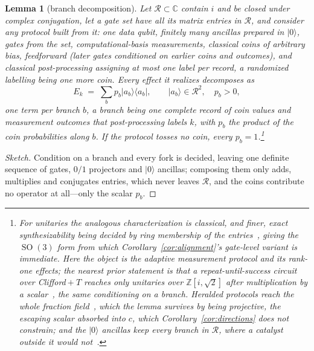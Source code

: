 \documentclass[11pt, oneside, openany]{scrbook}
\DeclareMathOperator{\SO}{SO}
\newcommand{\C}{\mathbb{C}}
\newtheorem{lemma}[theorem]{Lemma}
\newenvironment{sketch}{\renewcommand{\qedsymbol}{}\begin{proof}[Sketch]}{\end{proof}}
\newcommand{\ket}[1]{|#1\rangle}
\newcommand{\ketbra}[2]{|#1\rangle\langle#2|}
\begin{document}
\begin{lemma}[branch decomposition] \label{lem:branch}
Let $\mathcal{R} \subset \C$ contain $i$ and be closed under complex conjugation, let a gate set have all its matrix entries in $\mathcal{R}$, and consider any protocol built from it: one data qubit, finitely many ancillas prepared in $\ket{0}$, gates from the set, computational-basis measurements, classical coins of arbitrary bias, feedforward (later gates conditioned on earlier coins and outcomes), and classical post-processing assigning at most one label per record, a randomized labelling being one more coin. Every effect it realizes decomposes as
\begin{equation*}
E_k \;=\; \sum_{b} p_b \ketbra{a_b}{a_b}, \qquad \ket{a_b} \in \mathcal{R}^2, \quad p_b > 0,
\end{equation*}
one term per \textit{branch} $b$, a branch being one complete record of coin values and measurement outcomes that post-processing labels $k$, with $p_b$ the product of the coin probabilities along $b$. If the protocol tosses no coin, every $p_b = 1$.\footnote{For \textit{unitaries} the analogous characterization is classical, and finer, exact synthesizability being decided by \textit{ring} membership of the entries~\cite{kliuchnikov2013fastefficientexacta,giles2013exactsynthesismultiqubit,kliuchnikov2015frameworkexactsynthesis}, \textcite[\S2.4]{forest2015exactsynthesissinglequbit} giving the $\SO(3)$ form from which Corollary~\ref{cor:alignment}'s gate-level variant is immediate. Here the object is the adaptive measurement protocol and its rank-one effects; the nearest prior statement is that a repeat-until-success circuit over Clifford${}+T$ reaches only unitaries over $\mathbb{Z}[i,\sqrt{2}]$ \textit{after multiplication by a scalar}~\cite[\S3.1]{paetznick2014repeatuntilsuccessnondeterministicdecomposition}, the same conditioning on a branch. Heralded protocols reach the whole fraction field~\cite[Cor.~21]{bocharov2015efficientsynthesisuniversala}, which the lemma survives by being projective, the escaping scalar absorbed into $c$, which Corollary~\ref{cor:directions} does not constrain; and the $\ket{0}$ ancillas keep every branch in $\mathcal{R}$, where a catalyst outside it would not~\cite[\S VI\,B]{amy2023catalyticembeddingsquantum}.}
\end{lemma}

\begin{sketch}
Condition on a branch and every fork is decided, leaving one definite sequence of gates, $0/1$ projectors and $\ket{0}$ ancillas; composing them only adds, multiplies and conjugates entries, which never leaves $\mathcal{R}$, and the coins contribute no operator at all---only the scalar $p_b$.
\end{sketch}
\end{document}
